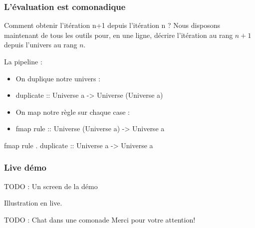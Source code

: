 \documentclass{beamer}
\begin{document}
\begin{frame}
\frametitle{L'évaluation est comonadique}
\begin{alertblock}{Comment obtenir l'itération n+1 depuis l'itération n ?}
Nous disposons maintenant de tous les outils pour, en une ligne, décrire l'itération au rang $n+1$ depuis l'univers au rang $n$.
\end{alertblock}
\pause
\begin{block}{La pipeline :}
\begin{itemize}
\item On duplique notre univers :
\item[] duplicate :: Universe a -> Universe (Universe a)
\item On map notre règle sur chaque case :
\item[] fmap rule :: Universe (Universe a) -> Universe a
\end{itemize}
\pause
\end{block}
\begin{exampleblock}{}
fmap rule . duplicate :: Universe a -> Universe a
\end{exampleblock}
\end{frame}

\begin{frame}
\frametitle{Live démo}
TODO : Un screen de la démo

Illustration en live.
\end{frame}

\begin{frame}

TODO : Chat dans une comonade
Merci pour votre attention!
\end{frame}
\end{document}
